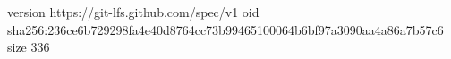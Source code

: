 version https://git-lfs.github.com/spec/v1
oid sha256:236ce6b729298fa4e40d8764cc73b99465100064b6bf97a3090aa4a86a7b57c6
size 336
